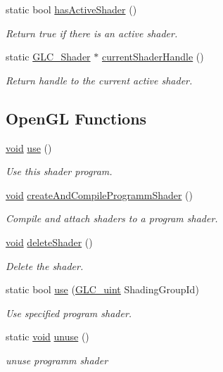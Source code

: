 \begin{DoxyCompactItemize}
static bool \hyperlink{class_g_l_c___shader_a8ee500ac41465e5969c08711687e1aa7}{has\-Active\-Shader} ()
\begin{DoxyCompactList}\small\item\em Return true if there is an active shader. \end{DoxyCompactList}\item 
static \hyperlink{class_g_l_c___shader}{G\-L\-C\-\_\-\-Shader} $\ast$ \hyperlink{class_g_l_c___shader_a6fa5aaf7116124922aae624e1dab14d0}{current\-Shader\-Handle} ()
\begin{DoxyCompactList}\small\item\em Return handle to the current active shader. \end{DoxyCompactList}\end{DoxyCompactItemize}
\subsection*{Open\-G\-L Functions}
\begin{DoxyCompactItemize}
\item 
\hyperlink{group___u_a_v_objects_plugin_ga444cf2ff3f0ecbe028adce838d373f5c}{void} \hyperlink{class_g_l_c___shader_a0922aafe5f89c3590e73778e6087bdad}{use} ()
\begin{DoxyCompactList}\small\item\em Use this shader program. \end{DoxyCompactList}\item 
\hyperlink{group___u_a_v_objects_plugin_ga444cf2ff3f0ecbe028adce838d373f5c}{void} \hyperlink{class_g_l_c___shader_a0c9bcf0827cf6b3ebc25eda36fc95d56}{create\-And\-Compile\-Programm\-Shader} ()
\begin{DoxyCompactList}\small\item\em Compile and attach shaders to a program shader. \end{DoxyCompactList}\item 
\hyperlink{group___u_a_v_objects_plugin_ga444cf2ff3f0ecbe028adce838d373f5c}{void} \hyperlink{class_g_l_c___shader_aa5ed5fe38a088fc2066cbf5795dde06c}{delete\-Shader} ()
\begin{DoxyCompactList}\small\item\em Delete the shader. \end{DoxyCompactList}\item 
static bool \hyperlink{class_g_l_c___shader_ad8dda7549018ffe4b6a779b7650da9c3}{use} (\hyperlink{glc__global_8h_abf950976fabed69026558df8e2da6c6b}{G\-L\-C\-\_\-uint} Shading\-Group\-Id)
\begin{DoxyCompactList}\small\item\em Use specified program shader. \end{DoxyCompactList}\item 
static \hyperlink{group___u_a_v_objects_plugin_ga444cf2ff3f0ecbe028adce838d373f5c}{void} \hyperlink{class_g_l_c___shader_a91647883902c957051e5268b894643fb}{unuse} ()
\begin{DoxyCompactList}\small\item\em unuse programm shader \end{DoxyCompactList}\end{DoxyCompactItemize}


